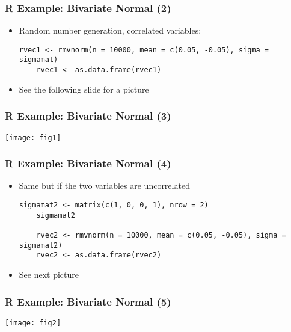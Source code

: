 \documentclass[10pt]{beamer}
\theoremstyle{definition}
\begin{document}
\begin{frame}[fragile]
\frametitle{R Example: Bivariate Normal (2)}
\begin{itemize}
	\item Random number generation, correlated variables:
	\begin{lstlisting}[style = rstyle, breaklines]
	rvec1 <- rmvnorm(n = 10000, mean = c(0.05, -0.05), sigma = sigmamat)
	rvec1 <- as.data.frame(rvec1)	
	\end{lstlisting}

	\item See the following slide for a picture
\end{itemize}
\end{frame}

\begin{frame}[fragile]
\frametitle{R Example: Bivariate Normal (3)}
\begin{center}
	\texttt{[image: fig1]}
\end{center}
\end{frame}

\begin{frame}[fragile]
\frametitle{R Example: Bivariate Normal (4)}
\begin{itemize}
	\item Same but if the two variables are uncorrelated
	\begin{lstlisting}[style = rstyle, breaklines]
	sigmamat2 <- matrix(c(1, 0, 0, 1), nrow = 2)
	sigmamat2
			
	rvec2 <- rmvnorm(n = 10000, mean = c(0.05, -0.05), sigma = sigmamat2)
	rvec2 <- as.data.frame(rvec2)	
	\end{lstlisting}
	
	\item See next picture
\end{itemize}
\end{frame}

\begin{frame}[fragile]
\frametitle{R Example: Bivariate Normal (5)}
\begin{center}
	\texttt{[image: fig2]}
\end{center}
\end{frame} 
\end{document}

